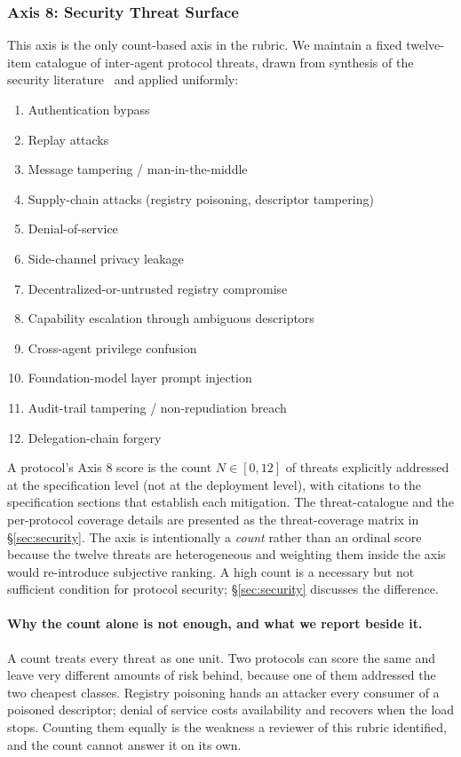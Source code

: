 \subsubsection{Axis 8: Security Threat Surface}
\label{sec:rubric:axis8}

This axis is the only count-based axis in the rubric. We
maintain a fixed twelve-item catalogue of inter-agent
protocol threats, drawn from synthesis of the security
literature~\cite{kong2025communication, a2asecbench,
zhan2024injecagent, agentleak, protocol_exploits,
a2a_weaknesses, threatmodel2026, did_vc_agents} and
applied uniformly:

\begin{enumerate}
  \item Authentication bypass
  \item Replay attacks
  \item Message tampering / man-in-the-middle
  \item Supply-chain attacks (registry poisoning,
    descriptor tampering)
  \item Denial-of-service
  \item Side-channel privacy leakage
  \item Decentralized-or-untrusted registry compromise
  \item Capability escalation through ambiguous
    descriptors
  \item Cross-agent privilege confusion
  \item Foundation-model layer prompt injection
  \item Audit-trail tampering / non-repudiation breach
  \item Delegation-chain forgery
\end{enumerate}

A protocol's Axis 8 score is the count $N \in [0, 12]$ of
threats explicitly addressed at the specification level
(not at the deployment level), with citations to the
specification sections that establish each mitigation. The
threat-catalogue and the per-protocol coverage details
are presented as the threat-coverage matrix
in \S\ref{sec:security}. The axis is intentionally a
\emph{count} rather than an ordinal score because the
twelve threats are heterogeneous and weighting them inside
the axis would re-introduce subjective ranking. A high
count is a necessary but not sufficient condition for
protocol security; \S\ref{sec:security} discusses the
difference.

\paragraph{Why the count alone is not enough, and what we
report beside it.}
A count treats every threat as one unit. Two protocols can
score the same and leave very different amounts of risk
behind, because one of them addressed the two cheapest
classes. Registry poisoning hands an attacker every
consumer of a poisoned descriptor; denial of service costs
availability and recovers when the load stops. Counting
them equally is the weakness a reviewer of this rubric
identified, and the count cannot answer it on its own.

